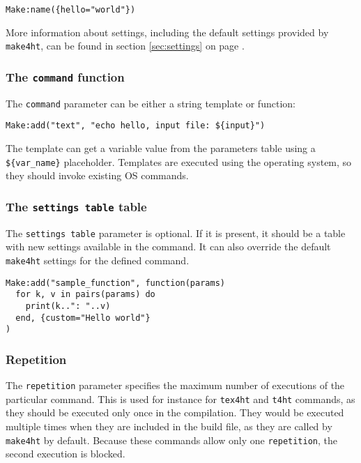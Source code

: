 \begin{verbatim}
Make:name({hello="world"})
\end{verbatim}

More information about settings, including the default settings provided
by \texttt{make4ht}, can be found in section \ref{sec:settings} on page
\pageref{sec:settings}.

\hypertarget{the-command-function}{%
\subsubsection{\texorpdfstring{The \texttt{command}
function}{The command function}}\label{the-command-function}}

\label{sec:commandfunction}

The \texttt{command} parameter can be either a string template or
function:

\begin{verbatim}
Make:add("text", "echo hello, input file: ${input}")
\end{verbatim}

The template can get a variable value from the parameters table using a
\texttt{\$\{var\_name\}} placeholder. Templates are executed using the
operating system, so they should invoke existing OS commands.

\hypertarget{the-settings-table-table}{%
\subsubsection{\texorpdfstring{The \texttt{settings\ table}
table}{The settings table table}}\label{the-settings-table-table}}

The \texttt{settings\ table} parameter is optional. If it is present, it
should be a table with new settings available in the command. It can
also override the default \texttt{make4ht} settings for the defined
command.

\begin{verbatim}
Make:add("sample_function", function(params) 
  for k, v in pairs(params) do 
    print(k..": "..v) 
  end, {custom="Hello world"}
)
\end{verbatim}

\hypertarget{repetition}{%
\subsubsection{Repetition}\label{repetition}}

The \texttt{repetition} parameter specifies the maximum number of
executions of the particular command. This is used for instance for
\texttt{tex4ht} and \texttt{t4ht} commands, as they should be executed
only once in the compilation. They would be executed multiple times when
they are included in the build file, as they are called by
\texttt{make4ht} by default. Because these commands allow only one
\texttt{repetition}, the second execution is blocked.

